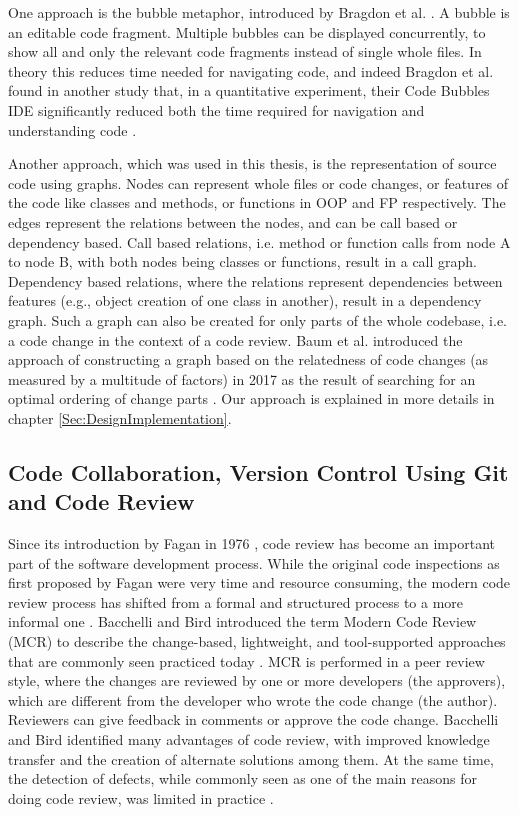 \documentclass[a4paper,11pt,twoside]{article}
\theoremstyle{definition} %
\renewcommand{\cite}[1]{\citep{#1}}
\begin{document}
One approach is the bubble metaphor, introduced by Bragdon et al. \cite{Bragdon_2010}. A bubble is an editable code fragment. Multiple bubbles can be displayed concurrently, to show all and only the relevant code fragments instead of single whole files. In theory this reduces time needed for navigating code, and indeed Bragdon et al. found in another study that, in a quantitative experiment, their Code Bubbles IDE significantly reduced both the time required for navigation and understanding code \cite{bragdon2010code}. 

Another approach, which was used in this thesis, is the representation of source code using graphs. Nodes can represent whole files or code changes, or features of the code like classes and methods, or functions in OOP and FP respectively. The edges represent the relations between the nodes, and can be call based or dependency based. Call based relations, i.e. method or function calls from node A to node B, with both nodes being classes or functions, result in a call graph. Dependency based relations, where the relations represent dependencies between features (e.g., object creation of one class in another), result in a dependency graph. Such a graph can also be created for only parts of the whole codebase, i.e. a code change in the context of a code review. Baum et al. introduced the approach of constructing a graph based on the relatedness of code changes (as measured by a multitude of factors) in 2017 as the result of searching for an optimal ordering of change parts \cite{baum2017optimal}. Our approach is explained in more details in chapter \ref{Sec:DesignImplementation}.


\subsection{Code Collaboration, Version Control Using Git and Code Review}  \label{SubSec:CodeCol+VersCntrlGit+CodeRev}

Since its introduction by Fagan in 1976 \cite{Fagan-1976}, code review has become an important part of the software development process. While the original code inspections as first proposed by Fagan were very time and resource consuming, the modern code review process has shifted from a formal and structured process to a more informal one \cite{6606617}. Bacchelli and Bird introduced the term Modern Code Review (MCR) to describe the change-based, lightweight, and tool-supported approaches that are commonly seen practiced today \cite{6606617}. MCR is performed in a peer review style, where the changes are reviewed by one or more developers (the approvers), which are different from the developer who wrote the code change (the author). Reviewers can give feedback in comments or approve the code change. Bacchelli and Bird identified many advantages of code review, with improved knowledge transfer and the creation of alternate solutions among them. At the same time, the detection of defects, while commonly seen as one of the main reasons for doing code review, was limited in practice \cite{6606617}. 
\end{document}
